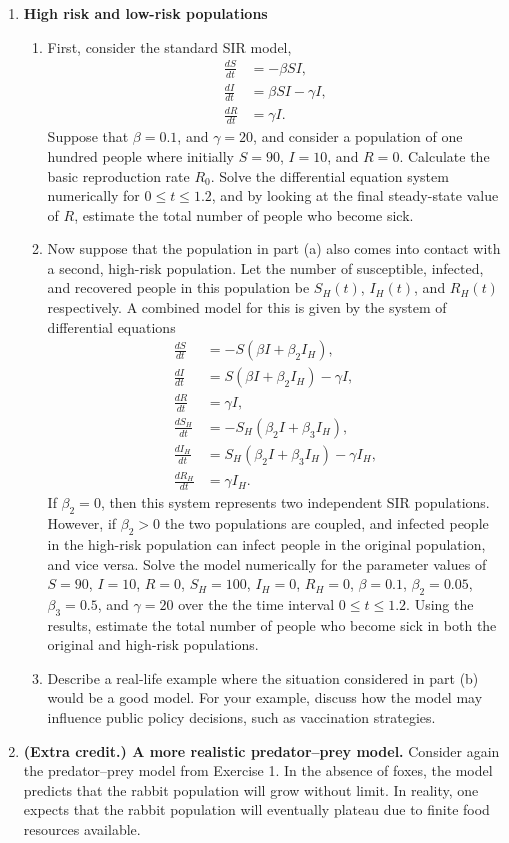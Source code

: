 \documentclass[12pt]{article}
\begin{document}
\begin{enumerate}
      \item \textbf{High risk and low-risk populations}
          \begin{enumerate}
 \item First, consider the
	standard SIR model,
	\begin{align*}
	  \frac{dS}{dt} &= -\beta S I, \\
	  \frac{dI}{dt} &= \beta S I - \gamma I, \\
	  \frac{dR}{dt} &= \gamma I.
	\end{align*}
	Suppose that $\beta=0.1$, and $\gamma=20$, and consider a population of
	one hundred people where initially $S=90$, $I=10$, and $R=0$. Calculate
	the basic reproduction rate $R_0$. Solve the differential equation
	system numerically for $0\le t \le 1.2$, and by looking at the final
	steady-state value of $R$, estimate the total number of people who
	become sick.
      \item Now suppose that the population in part (a) also comes into contact
	with a second, high-risk population. Let the number of susceptible,
	infected, and recovered people in this population be $S_H(t)$,
	$I_H(t)$, and $R_H(t)$ respectively. A combined model for this is given
	by the system of differential equations
	\begin{align*}
	  \frac{dS}{dt} &= -S(\beta I + \beta_2 I_H), \\
	  \frac{dI}{dt} &= S(\beta I + \beta_2 I_H) - \gamma I, \\
	  \frac{dR}{dt} &= \gamma I, \\
	  \frac{dS_H}{dt} &= -S_H(\beta_2 I + \beta_3 I_H), \\
	  \frac{dI_H}{dt} &= S_H(\beta_2 I + \beta_3 I_H) - \gamma I_H, \\
	  \frac{dR_H}{dt} &= \gamma I_H.
        \end{align*}
	If $\beta_2=0$, then this system represents two independent SIR
	populations. However, if $\beta_2>0$ the two populations are coupled,
	and infected people in the high-risk population can infect people in
	the original population, and vice versa. Solve the model numerically
	for the parameter values of $S=90$, $I=10$, $R=0$, $S_H=100$, $I_H=0$,
	$R_H=0$, $\beta=0.1$, $\beta_2=0.05$, $\beta_3=0.5$, and $\gamma=20$
	over the the time interval $0 \le t \le 1.2$. Using the results,
	estimate the total number of people who become sick in both the
	original and high-risk populations.
      \item Describe a real-life example where the situation considered in part
	(b) would be a good model. For your example, discuss how the model may
	influence public policy decisions, such as vaccination strategies.
  \end{enumerate}
\item \textbf{(Extra credit.) A more realistic predator--prey model.} Consider
  again the predator--prey model from Exercise 1. In the absence of foxes, the
  model predicts that the rabbit population will grow without limit. In reality,
  one expects that the rabbit population will eventually plateau due to finite
  food resources available.


\end{enumerate}
\end{document}
